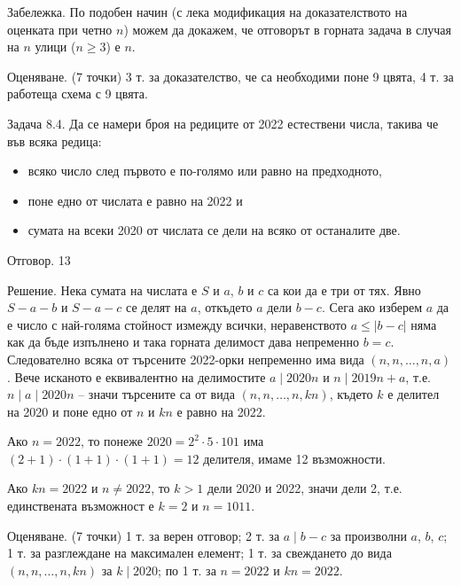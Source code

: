 Забележка. По подобен начин (с лека модификация на доказателството на оценката при четно $n$) можем да докажем, че отговорът в горната задача в случая на $n$ улици ($n \geq 3$) е $n$.

Оценяване. (7 точки) 3 т. за доказателство, че са необходими поне 9 цвята, 4 т. за работеща схема с 9 цвята.

Задача 8.4. Да се намери броя на редиците от 2022 естествени числа, такива че във всяка редица:

\begin{itemize}
\item всяко число след първото е по-голямо или равно на предходното,
\item поне едно от числата е равно на 2022 и
\item сумата на всеки 2020 от числата се дели на всяко от останалите две.
\end{itemize}

Отговор. 13

Решение. Нека сумата на числата е $S$ и $a$, $b$ и $c$ са кои да е три от тях. Явно $S-a-b$ и $S-a-c$ се делят на $a$, откъдето $a$ дели $b-c$. Сега ако изберем $a$ да е число с най-голяма стойност измежду всички, неравенството $a \leq|b-c|$ няма как да бъде изпълнено и така горната делимост дава непременно $b=c$. Следователно всяка от търсените 2022-орки непременно има вида $(n, n, \ldots, n, a)$. Вече исканото е еквивалентно на делимостите $a \mid 2020 n$ и $n \mid 2019 n+a$, т.е. $n \mid a \mid 2020 n$ – значи търсените са от вида $(n, n, \ldots, n, k n)$, където $k$ е делител на 2020 и поне едно от $n$ и $k n$ е равно на 2022.

Ако $n=2022$, то понеже $2020=2^{2} \cdot 5 \cdot 101$ има $(2+1) \cdot(1+1) \cdot(1+1)=12$ делителя, имаме 12 възможности.

Ако $k n=2022$ и $n \neq 2022$, то $k>1$ дели 2020 и 2022, значи дели 2, т.е. единствената възможност е $k=2$ и $n=1011$.

Оценяване. (7 точки) 1 т. за верен отговор; 2 т. за $a \mid b-c$ за произволни $a$, $b$, $c$; 1 т. за разглеждане на максимален елемент; 1 т. за свеждането до вида $(n, n, \ldots, n, k n)$ за $k \mid 2020$; по 1 т. за $n=2022$ и $k n=2022$.
